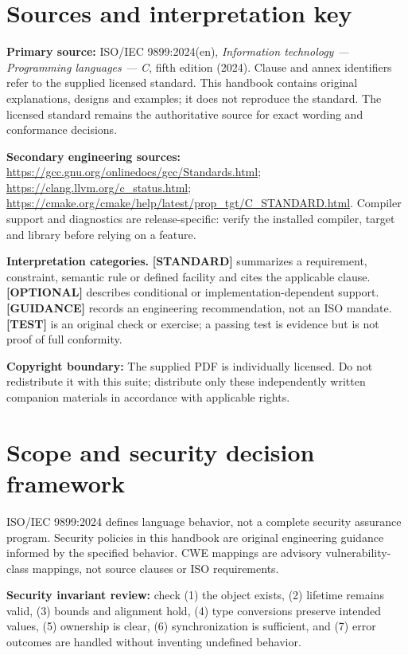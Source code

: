 \documentclass[10pt,letterpaper,oneside]{report}
\begin{document}
\chapter*{Sources and interpretation key}
\textbf{Primary source:} ISO/IEC 9899:2024(en), \emph{Information technology --- Programming languages --- C}, fifth edition (2024). Clause and annex identifiers refer to the supplied licensed standard. This handbook contains original explanations, designs and examples; it does not reproduce the standard. The licensed standard remains the authoritative source for exact wording and conformance decisions.\par
\textbf{Secondary engineering sources:} \url{https://gcc.gnu.org/onlinedocs/gcc/Standards.html}; \url{https://clang.llvm.org/c_status.html}; \url{https://cmake.org/cmake/help/latest/prop_tgt/C_STANDARD.html}. Compiler support and diagnostics are release-specific: verify the installed compiler, target and library before relying on a feature.\par
\begin{keybox}\textbf{Interpretation categories.} \textbf{[STANDARD]} summarizes a requirement, constraint, semantic rule or defined facility and cites the applicable clause. \textbf{[OPTIONAL]} describes conditional or implementation-dependent support. \textbf{[GUIDANCE]} records an engineering recommendation, not an ISO mandate. \textbf{[TEST]} is an original check or exercise; a passing test is evidence but is not proof of full conformity.\end{keybox}
\textbf{Copyright boundary:} The supplied PDF is individually licensed. Do not redistribute it with this suite; distribute only these independently written companion materials in accordance with applicable rights.\par


\chapter{Scope and security decision framework}
ISO/IEC 9899:2024 defines language behavior, not a complete security assurance program. Security policies in this handbook are original engineering guidance informed by the specified behavior. CWE mappings are advisory vulnerability-class mappings, not source clauses or ISO requirements.\par
\begin{keybox}\textbf{Security invariant review:} check (1) the object exists, (2) lifetime remains valid, (3) bounds and alignment hold, (4) type conversions preserve intended values, (5) ownership is clear, (6) synchronization is sufficient, and (7) error outcomes are handled without inventing undefined behavior.\end{keybox}
\end{document}
